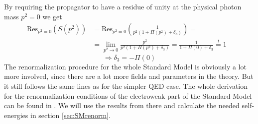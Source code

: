 By requiring the propagator to have a residue of unity at the physical photon mass $p^2=0$ we get
\begin{align*}
\mathrm{Res}_{p^2 = 0} \left( S(p^2) \right) & = \mathrm{Res}_{p^2=0} \left( \frac{1}{p^2 \left( 1 + \Pi(p^2) + \delta_3 \right)} \right) = & \\
& = \lim_{p^2 \rightarrow 0} \frac{p^2}{p^2 \left( 1 + \Pi(p^2) + \delta_3 \right)} = \frac{1}{1+\Pi(0)+\delta_3} \overset{\mathrm{!}}{=} 1 &
\end{align*}
\begin{equation}
\Rightarrow \delta_3 = - \Pi(0)
\end{equation}
The renormalization procedure for the whole Standard Model is obviously a lot more involved, since there are a lot more fields and parameters in the theory. But it still follows the same lines as for the simpler QED case. The whole derivation for the renormalization conditions of the electroweak part of the Standard Model can be found in \cite{SMrenorm}. We will use the results from there and calculate the needed self-energies in section \ref{sec:SMrenorm}. \\

